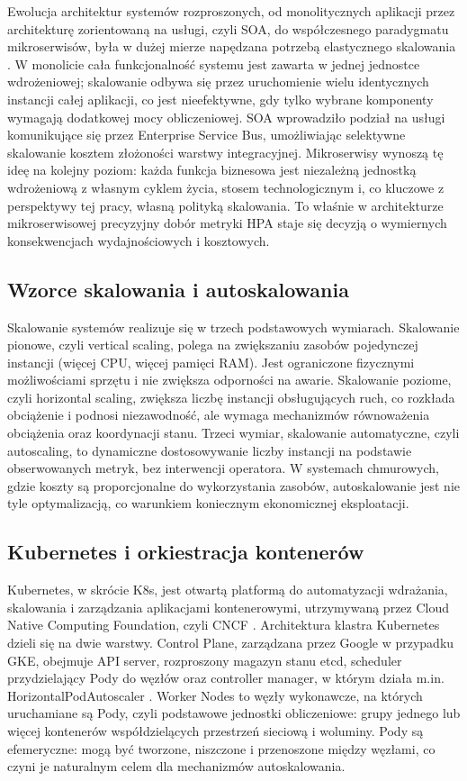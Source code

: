 Ewolucja architektur systemów rozproszonych, od monolitycznych aplikacji przez architekturę zorientowaną na usługi, czyli SOA, do współczesnego paradygmatu mikroserwisów, była w dużej mierze napędzana potrzebą elastycznego skalowania \cite{microservices2019}. W monolicie cała funkcjonalność systemu jest zawarta w jednej jednostce wdrożeniowej; skalowanie odbywa się przez uruchomienie wielu identycznych instancji całej aplikacji, co jest nieefektywne, gdy tylko wybrane komponenty wymagają dodatkowej mocy obliczeniowej. SOA wprowadziło podział na usługi komunikujące się przez Enterprise Service Bus, umożliwiając selektywne skalowanie kosztem złożoności warstwy integracyjnej. Mikroserwisy wynoszą tę ideę na kolejny poziom: każda funkcja biznesowa jest niezależną jednostką wdrożeniową z własnym cyklem życia, stosem technologicznym i, co kluczowe z perspektywy tej pracy, własną polityką skalowania. To właśnie w architekturze mikroserwisowej precyzyjny dobór metryki HPA staje się decyzją o wymiernych konsekwencjach wydajnościowych i kosztowych.

\subsection{Wzorce skalowania i autoskalowania}

Skalowanie systemów realizuje się w trzech podstawowych wymiarach. Skalowanie pionowe, czyli vertical scaling, polega na zwiększaniu zasobów pojedynczej instancji (więcej CPU, więcej pamięci RAM). Jest ograniczone fizycznymi możliwościami sprzętu i nie zwiększa odporności na awarie. Skalowanie poziome, czyli horizontal scaling, zwiększa liczbę instancji obsługujących ruch, co rozkłada obciążenie i podnosi niezawodność, ale wymaga mechanizmów równoważenia obciążenia oraz koordynacji stanu. Trzeci wymiar, skalowanie automatyczne, czyli autoscaling, to dynamiczne dostosowywanie liczby instancji na podstawie obserwowanych metryk, bez interwencji operatora. W systemach chmurowych, gdzie koszty są proporcjonalne do wykorzystania zasobów, autoskalowanie jest nie tyle optymalizacją, co warunkiem koniecznym ekonomicznej eksploatacji.

\subsection{Kubernetes i orkiestracja kontenerów}

Kubernetes, w skrócie K8s, jest otwartą platformą do automatyzacji wdrażania, skalowania i zarządzania aplikacjami kontenerowymi, utrzymywaną przez Cloud Native Computing Foundation, czyli CNCF \cite{kubernetes2023}. Architektura klastra Kubernetes dzieli się na dwie warstwy. Control Plane, zarządzana przez Google w przypadku GKE, obejmuje API server, rozproszony magazyn stanu etcd, scheduler przydzielający Pody do węzłów oraz controller manager, w którym działa m.in. HorizontalPodAutoscaler \cite{kubernetes-hpa}. Worker Nodes to węzły wykonawcze, na których uruchamiane są Pody, czyli podstawowe jednostki obliczeniowe: grupy jednego lub więcej kontenerów współdzielących przestrzeń sieciową i woluminy. Pody są efemeryczne: mogą być tworzone, niszczone i przenoszone między węzłami, co czyni je naturalnym celem dla mechanizmów autoskalowania.

